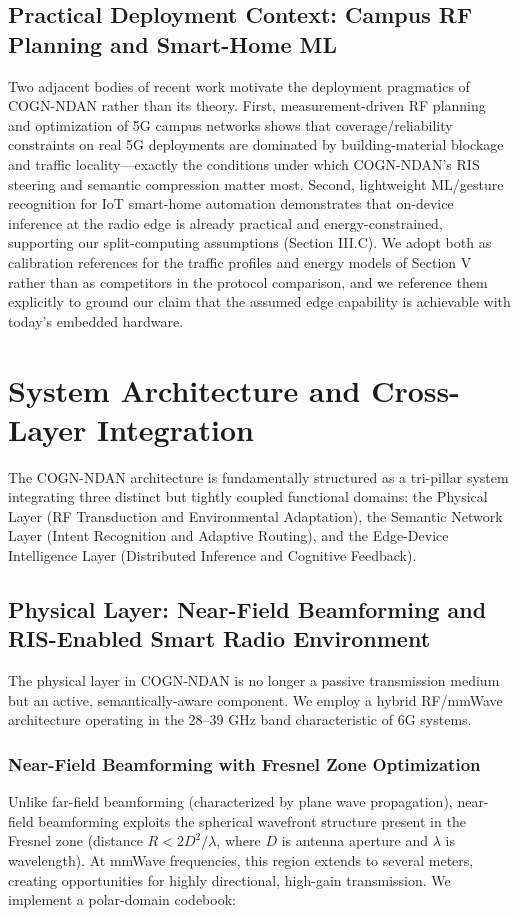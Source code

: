 \documentclass{BVP_CINC}
\newcommand{\COGN}{COGN-NDAN}
\begin{document}
\subsection{Practical Deployment Context: Campus RF Planning and Smart-Home ML}
Two adjacent bodies of recent work motivate the deployment pragmatics of \COGN{} rather than its theory. First, measurement-driven RF planning and optimization of 5G campus networks \cite{rischke2021campus,khokher2024rf} shows that coverage/reliability constraints on real 5G deployments are dominated by building-material blockage and traffic locality---exactly the conditions under which \COGN{}'s RIS steering and semantic compression matter most. Second, lightweight ML/gesture recognition for IoT smart-home automation \cite{yang2021gesture} demonstrates that on-device inference at the radio edge is already practical and energy-constrained, supporting our split-computing assumptions (Section III.C). We adopt both as calibration references for the traffic profiles and energy models of Section V rather than as competitors in the protocol comparison, and we reference them explicitly to ground our claim that the assumed edge capability is achievable with today's embedded hardware.

\section{System Architecture and Cross-Layer Integration}

The \COGN{} architecture is fundamentally structured as a tri-pillar system integrating three distinct but tightly coupled functional domains: the Physical Layer (RF Transduction and Environmental Adaptation), the Semantic Network Layer (Intent Recognition and Adaptive Routing), and the Edge-Device Intelligence Layer (Distributed Inference and Cognitive Feedback).

\subsection{Physical Layer: Near-Field Beamforming and RIS-Enabled Smart Radio Environment}

The physical layer in \COGN{} is no longer a passive transmission medium but an active, semantically-aware component. We employ a hybrid RF/mmWave architecture operating in the 28--39 GHz band characteristic of 6G systems.

\subsubsection{Near-Field Beamforming with Fresnel Zone Optimization}
Unlike far-field beamforming (characterized by plane wave propagation), near-field beamforming exploits the spherical wavefront structure present in the Fresnel zone (distance $R < 2D^2/\lambda$, where $D$ is antenna aperture and $\lambda$ is wavelength). At mmWave frequencies, this region extends to several meters, creating opportunities for highly directional, high-gain transmission. We implement a polar-domain codebook:
\end{document}
